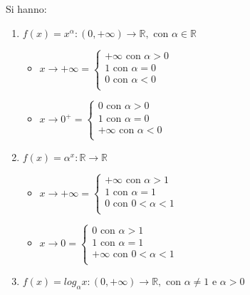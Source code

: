 \documentclass[a4paper,12pt, oneside]{book}
\begin{document}
\newpage
\begin{shaded}
\begin{nota}
Si hanno:
\begin{enumerate}
\item $f(x)=x^\alpha : (0,+\infty)\rightarrow \mathbb{R}, \mbox{ con }\alpha \in \mathbb{R}$
	\begin{itemize}
	\item $x\rightarrow +\infty=\left\{
                \begin{array}{ll}
                +\infty \mbox{ con } \alpha>0 \\
               	1 \mbox{ con } \alpha=0 \\
                0 \mbox{ con } \alpha<0 \\
				\end{array}
				\right.$
	\item $x\rightarrow 0^{+}=\left\{
                \begin{array}{ll}
                0 \mbox{ con } \alpha>0 \\
               	1 \mbox{ con } \alpha=0 \\
                +\infty \mbox{ con } \alpha<0 \\
				\end{array}
				\right.$
	\end{itemize}
\item $f(x)=\alpha^x : \mathbb{R}\rightarrow \mathbb{R}$
	\begin{itemize}
	\item $x\rightarrow +\infty=\left\{
                \begin{array}{ll}
                +\infty \mbox{ con } \alpha>1 \\
               	1 \mbox{ con } \alpha=1 \\
                0 \mbox{ con } 0<\alpha<1 \\
				\end{array}
				\right.$
	\item $x\rightarrow 0=\left\{
                \begin{array}{ll}
                0 \mbox{ con } \alpha>1 \\
               	1 \mbox{ con } \alpha=1 \\
                +\infty \mbox{ con } 0<\alpha<1 \\
				\end{array}
				\right.$
	\end{itemize}
\item $f(x)=log_\alpha x : (0,+\infty)\rightarrow \mathbb{R}, \mbox{ con } \alpha\neq 1 \mbox{ e } \alpha >0$

\end{enumerate}
\end{nota}
\end{shaded}
\end{document}
